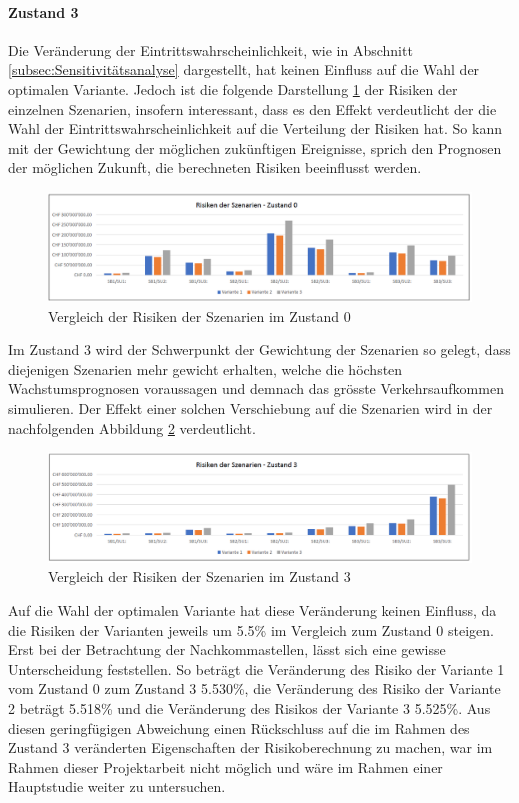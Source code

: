 \paragraph{Zustand 3} 

Die Veränderung der Eintrittswahrscheinlichkeit, wie in Abschnitt \ref{subsec:Sensitivitätsanalyse} dargestellt, hat keinen Einfluss auf die Wahl der optimalen Variante. Jedoch ist die folgende Darstellung \ref{img:SzeVer-Z0} der Risiken der einzelnen Szenarien, insofern interessant, dass es den Effekt verdeutlicht der die Wahl der Eintrittswahrscheinlichkeit auf die Verteilung der Risiken hat. So kann mit der Gewichtung der möglichen zukünftigen Ereignisse, sprich den Prognosen der möglichen Zukunft, die berechneten Risiken beeinflusst werden. 

\begin{figure}[h!]
	\centering
	\includegraphics[width=\textwidth]{figures/f-06-04-RisikenSzenarienZ0}
	\caption[Szenarienvergleich im Zustand 0]{Vergleich der Risiken der Szenarien im Zustand 0}
	\label{img:SzeVer-Z0}
\end{figure} 

Im Zustand 3 wird der Schwerpunkt der Gewichtung der Szenarien so gelegt, dass diejenigen Szenarien mehr gewicht erhalten, welche die höchsten Wachstumsprognosen voraussagen und demnach das grösste Verkehrsaufkommen simulieren. Der Effekt einer solchen Verschiebung auf die Szenarien wird in der nachfolgenden Abbildung \ref{img:SzeVer-Z3} verdeutlicht. 

\begin{figure}[h!]
	\centering
	\includegraphics[width=.45\textwidth]{figures/f-06-05-RisikenSzenarienZ3}
	\caption[Szenarienvergleich im Zustand 3]{Vergleich der Risiken der Szenarien im Zustand 3}
	\label{img:SzeVer-Z3}
\end{figure} 

Auf die Wahl der optimalen Variante hat diese Veränderung keinen Einfluss, da die Risiken der Varianten jeweils um 5.5\% im Vergleich zum Zustand 0 steigen. Erst bei der Betrachtung der Nachkommastellen, lässt sich eine gewisse Unterscheidung feststellen. So beträgt die Veränderung des Risiko der Variante 1 vom Zustand 0 zum Zustand 3 5.530\%, die Veränderung des Risiko der Variante 2 beträgt 5.518\% und die Veränderung des Risikos der Variante 3 5.525\%. Aus diesen geringfügigen Abweichung einen Rückschluss auf die im Rahmen des Zustand 3 veränderten Eigenschaften der Risikoberechnung zu machen, war im Rahmen dieser Projektarbeit nicht möglich und wäre im Rahmen einer Hauptstudie weiter zu untersuchen.


